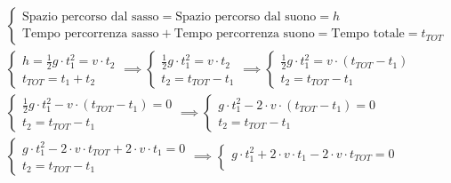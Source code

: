 \documentclass{article}
\begin{document}
\begin{enumerate}
\begin{align*}
               & \begin{cases}
                     \text{Spazio percorso dal sasso} = \text{Spazio percorso dal suono} = h \\
                     \text{Tempo percorrenza sasso} + \text{Tempo percorrenza suono} = \text{Tempo totale} = t_{TOT}
                 \end{cases} \\
               & \begin{cases}
                     h = \frac{1}{2} g \cdot t_1^2 = v \cdot t_2 \\
                     t_{TOT} = t_1 + t_2
                 \end{cases}
              \implies
              \begin{cases}
                  \frac{1}{2} g \cdot t_1^2 = v \cdot t_2 \\
                  t_2 = t_{TOT} - t_1
              \end{cases}
              \implies
              \begin{cases}
                  \frac{1}{2} g \cdot t_1^2 = v \cdot (t_{TOT} - t_1) \\
                  t_2 = t_{TOT} - t_1
              \end{cases}                                               \\
               & \begin{cases}
                     \frac{1}{2} g \cdot t_1^2 - v \cdot (t_{TOT} - t_1) = 0 \\
                     t_2 = t_{TOT} - t_1
                 \end{cases}
              \implies
              \begin{cases}
                  g \cdot t_1^2 - 2 \cdot v \cdot (t_{TOT} - t_1) = 0 \\
                  t_2 = t_{TOT} - t_1
              \end{cases}                                               \\
               & \begin{cases}
                     g \cdot t_1^2 - 2 \cdot v \cdot t_{TOT} + 2 \cdot v \cdot t_1 = 0 \\
                     t_2 = t_{TOT} - t_1
                 \end{cases}
              \implies
              \begin{cases}
                  g \cdot t_1^2 + 2 \cdot v \cdot t_1 - 2 \cdot v \cdot t_{TOT} = 0 \\

\end{cases}
\end{align*}
\end{enumerate}
\end{document}
